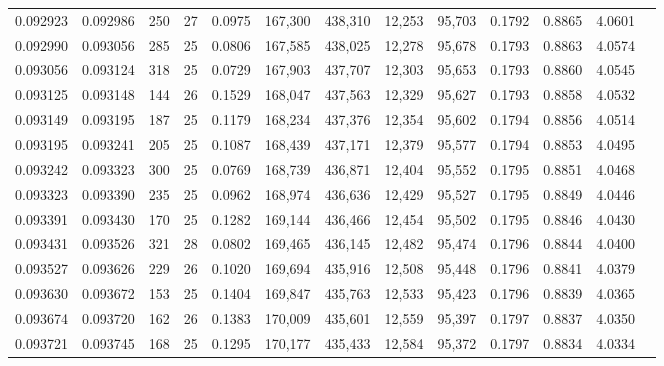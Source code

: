 \begin{tabular}{rrrrrrrrrrrrr}
0.092923 & 0.092986 & 250 &  27 &                                     0.0975 & 167,300 & 438,310 &  12,253 &  95,703 & 0.1792 & 0.8865 & 4.0601 \\
0.092990 & 0.093056 & 285 &  25 &                                     0.0806 & 167,585 & 438,025 &  12,278 &  95,678 & 0.1793 & 0.8863 & 4.0574 \\
0.093056 & 0.093124 & 318 &  25 &                                     0.0729 & 167,903 & 437,707 &  12,303 &  95,653 & 0.1793 & 0.8860 & 4.0545 \\
0.093125 & 0.093148 & 144 &  26 &                                     0.1529 & 168,047 & 437,563 &  12,329 &  95,627 & 0.1793 & 0.8858 & 4.0532 \\
0.093149 & 0.093195 & 187 &  25 &                                     0.1179 & 168,234 & 437,376 &  12,354 &  95,602 & 0.1794 & 0.8856 & 4.0514 \\
0.093195 & 0.093241 & 205 &  25 &                                     0.1087 & 168,439 & 437,171 &  12,379 &  95,577 & 0.1794 & 0.8853 & 4.0495 \\
0.093242 & 0.093323 & 300 &  25 &                                     0.0769 & 168,739 & 436,871 &  12,404 &  95,552 & 0.1795 & 0.8851 & 4.0468 \\
0.093323 & 0.093390 & 235 &  25 &                                     0.0962 & 168,974 & 436,636 &  12,429 &  95,527 & 0.1795 & 0.8849 & 4.0446 \\
0.093391 & 0.093430 & 170 &  25 &                                     0.1282 & 169,144 & 436,466 &  12,454 &  95,502 & 0.1795 & 0.8846 & 4.0430 \\
0.093431 & 0.093526 & 321 &  28 &                                     0.0802 & 169,465 & 436,145 &  12,482 &  95,474 & 0.1796 & 0.8844 & 4.0400 \\
0.093527 & 0.093626 & 229 &  26 &                                     0.1020 & 169,694 & 435,916 &  12,508 &  95,448 & 0.1796 & 0.8841 & 4.0379 \\
0.093630 & 0.093672 & 153 &  25 &                                     0.1404 & 169,847 & 435,763 &  12,533 &  95,423 & 0.1796 & 0.8839 & 4.0365 \\
0.093674 & 0.093720 & 162 &  26 &                                     0.1383 & 170,009 & 435,601 &  12,559 &  95,397 & 0.1797 & 0.8837 & 4.0350 \\
0.093721 & 0.093745 & 168 &  25 &                                     0.1295 & 170,177 & 435,433 &  12,584 &  95,372 & 0.1797 & 0.8834 & 4.0334 \\

\end{tabular}
